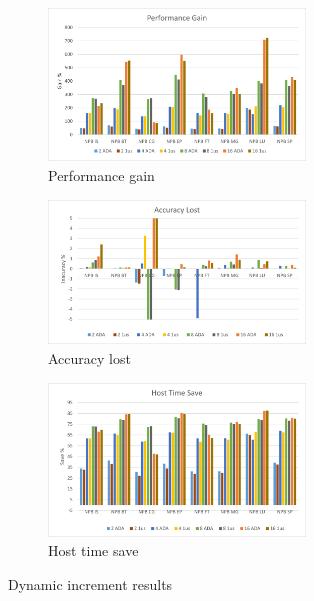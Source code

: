 \begin{figure}[H]
\centering
\begin{subfigure}{\textwidth}
    \centering
    \includegraphics[width=0.75\textwidth]{Images/Performance_ADA.png}
    \caption{ Performance gain}
    \label{fig:Performance_ADAINC}
\end{subfigure}
\begin{subfigure}{\textwidth}
    \centering
    \includegraphics[width=0.75\textwidth]{Images/Accuracy_ADA.png}
    \caption{ Accuracy lost}
    \label{fig:Accuracy_ADAINC}
\end{subfigure}
\begin{subfigure}{\textwidth}
    \centering
    \includegraphics[width=0.75\textwidth]{Images/Host_ADA.png}
    \caption{ Host time save}
    \label{fig:Host_ADAINC}
\end{subfigure}
        
\caption{Dynamic increment results}
\label{fig:results_ADAINC}
\end{figure}

